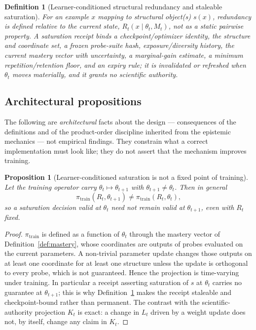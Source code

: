 \documentclass[11pt]{article}
\newtheorem{definition}{Definition}
\newtheorem{proposition}{Proposition}
\begin{document}
\begin{definition}[Learner-conditioned structural redundancy and staleable saturation]
\label{def:sat}
For an example $x$ mapping to structural object(s) $s(x)$, redundancy is defined \emph{relative to the current state}, $R_t(x\mid\theta_t,M_t)$, not as a static pairwise property. A saturation receipt binds a checkpoint/optimizer identity, the structure and coordinate set, a frozen probe-suite hash, exposure/diversity history, the current mastery vector with uncertainty, a marginal-gain estimate, a minimum repetition/retention floor, and an expiry rule; it is invalidated or refreshed when $\theta_t$ moves materially, and it grants no scientific authority.
\end{definition}

\subsection{Architectural propositions}
The following are \emph{architectural} facts about the design --- consequences of the definitions and of the product-order discipline inherited from the epistemic mechanics --- not empirical findings. They constrain what a correct implementation must look like; they do not assert that the mechanism improves training.

\begin{proposition}[Learner-conditioned saturation is not a fixed point of training]
\label{prop:nonidem}
Let the training operator carry $\theta_t\mapsto\theta_{t+1}$ with $\theta_{t+1}\neq\theta_t$. Then in general
\[
\pi_{\mathrm{train}}(R_t,\theta_{t+1})\neq\pi_{\mathrm{train}}(R_t,\theta_t),
\]
so a saturation decision valid at $\theta_t$ need not remain valid at $\theta_{t+1}$, even with $R_t$ fixed.
\end{proposition}
\begin{proof}
$\pi_{\mathrm{train}}$ is defined as a function of $\theta_t$ through the mastery vector of Definition~\ref{def:mastery}, whose coordinates are outputs of probes evaluated on the current parameters. A non-trivial parameter update changes those outputs on at least one coordinate for at least one structure unless the update is orthogonal to every probe, which is not guaranteed. Hence the projection is time-varying under training. In particular a receipt asserting saturation of $s$ at $\theta_t$ carries no guarantee at $\theta_{t+1}$; this is why Definition~\ref{def:sat} makes the receipt staleable and checkpoint-bound rather than permanent. The contrast with the scientific-authority projection $K_t$ is exact: a change in $L_t$ driven by a weight update does not, by itself, change any claim in $K_t$.
\end{proof}
\end{document}
